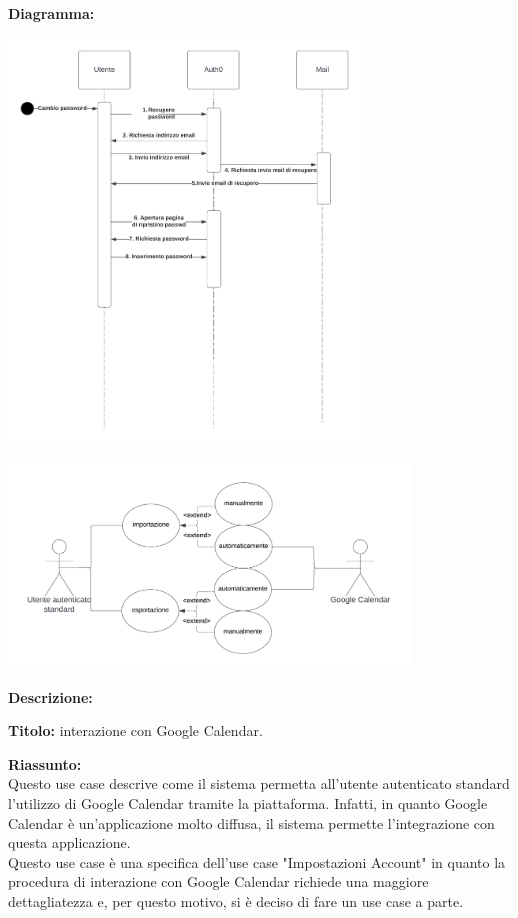 \begin{listaPersonale}[UC]{}
    \textbf{Diagramma:}
    \begin{center}
        \includegraphics[width=0.7\textwidth]{img/Diagrammi/DS/DS_RecuperoPassword.png}
    \end{center}

    \newpage


    \begin{center}
        \includegraphics[width=0.8\textwidth]{img/Diagrammi/UseCases/GoogleCalendar.png}
    \end{center}

    \textbf{Descrizione:}

    \textbf{Titolo:} interazione con Google Calendar.

    \textbf{Riassunto:} \\
    Questo use case descrive come il sistema permetta all'utente autenticato standard l'utilizzo di Google Calendar tramite la piattaforma. Infatti, in quanto Google Calendar è un'applicazione molto diffusa, il sistema permette l'integrazione con questa applicazione. \\ 
    Questo use case è una specifica dell'use case "Impostazioni Account" in quanto la procedura di interazione con Google Calendar richiede una maggiore dettagliatezza e, per questo motivo, si è deciso di fare un use case a parte.
    


\end{listaPersonale}
